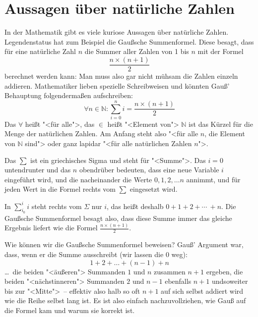 
\section{Aussagen über natürliche Zahlen}
\label{sec:mathematical-induction}
\label{sec:gausssche-summenformel}

In der Mathematik gibt es viele kuriose Aussagen über natürliche
Zahlen.  Legendenstatus hat zum Beispiel die Gaußsche
Summenformel.  Diese besagt, dass für
eine natürliche Zahl $n$ die Summer aller Zahlen von 1 bis $n$ mit der
Formel
\[\frac{n\times (n+1)}{2}\]
berechnet werden kann: Man muss also gar nicht mühsam die Zahlen
einzeln addieren.  Mathematiker lieben spezielle Schreibweisen und
könnten Gauß' Behauptung folgendermaßen aufschreiben:
%
\[\forall n\in\mathbb{N}: \sum_{i=0}^n i =
  \frac{n\times (n+1)}{2}\]
%
Das $\forall$ heißt "<für alle">, das $\in$ heißt "<Element von">
$\mathbb{N}$ ist das Kürzel für die Menge der natürlichen Zahlen.
Am Anfang steht also "<für alle $n$, die Element von $\mathbb{N}$
sind"> oder ganz lapidar "<für alle natürlichen Zahlen $n$">.

Das $\sum$ ist ein griechisches Sigma und steht für "<Summe">.  Das
$i=0$ untendrunter und das $n$ obendrüber bedeuten, dass eine neue
Variable $i$ eingeführt wird, und die nacheinander die Werte $0, 1, 2,
\ldots n$ annimmt, und für jeden Wert in die Formel rechts vom $\sum$
eingesetzt wird.

In $\sum_{i_0}^i i$ steht rechts vom $\Sigma$ nur $i$, das heißt
deshalb $0 + 1 + 2 + \cdots \ + n$.  Die Gaußsche Summenformel besagt
also, dass diese Summe immer das gleiche Ergebnis liefert wie die
Formel $\frac{n\times (n+1)}{2}$.

Wie können wir die Gaußsche Summenformel beweisen?  Gauß' Argument war, dass,
wenn er die Summe ausschreibt (wir lassen die $0$ weg):
%
\[ 1+2+\ldots+(n-1) + n \]
%
\ldots~die beiden "<äußeren"> Summanden $1$ und $n$ zusammen $n+1$
ergeben, die beiden "<nächstinneren"> Summanden $2$ und $n-1$
ebenfalls $n+1$ undsoweiter bis zur "<Mitte">~-- effektiv also halb so
oft $n+1$ auf sich selbst addiert wird wie die Reihe selbst lang ist.
Es ist also einfach nachzuvollziehen, wie Gauß auf die Formel kam und
warum sie korrekt ist.

